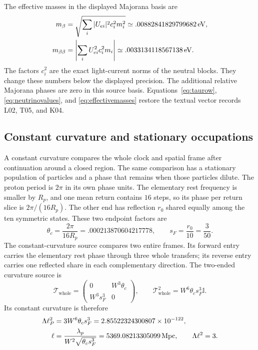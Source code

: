 \documentclass[aps,prx,onecolumn,10pt,notitlepage,nofootinbib,longbibliography]{revtex4-2}
\numberwithin{equation}{section}
\numberwithin{table}{section}
\newcommand{\Id}{\mathbb I}
\newcommand{\eV}{\,\mathrm{eV}}
\newcommand{\lamP}{\lambda_p}
\begin{document}
The effective masses in the displayed Majorana basis are
\begin{align}
 m_\beta&=\sqrt{\sum_i|U_{ei}|^2c_i^2m_i^2}\simeq.00882841829799682\eV,\notag\\
 m_{\beta\beta}&=\left|\sum_iU_{ei}^2c_i^2m_i\right|\simeq.0033134118567138\eV.
 \label{eq:effectivemasses}
\end{align}
The factors $c_i^2$ are the exact light-current norms of the neutral blocks. They change these numbers below the displayed precision. The additional relative Majorana phases are zero in this source basis. Equations~\eqref{eq:taurow}, \eqref{eq:neutrinovalues}, and \eqref{eq:effectivemasses} restore the textual vector records L02, T05, and K04.

\subsection{Constant curvature and stationary occupations}
A constant curvature compares the whole clock and spatial frame after continuation around a closed region. The same comparison has a stationary population of particles and a phase that remains when those particles dilute. The proton period is $2\pi$ in its own phase units. The elementary rest frequency is smaller by $R_p$, and one mean return contains $16$ steps, so its phase per return slice is $2\pi/(16R_p)$. The other end has reflection $r_0$ shared equally among the ten symmetric states. These two endpoint factors are
\begin{equation}
 \theta_c=\frac{2\pi}{16R_p}=.000213870604217778,\qquad
 s_F=\frac{r_0}{10}=\frac3{50}.
\end{equation}
The constant-curvature source compares two entire frames. Its forward entry carries the elementary rest phase through three whole transfers; its reverse entry carries one reflected share in each complementary direction. The two-ended curvature source is
\begin{equation}
 \mathcal T_{\mathrm{whole}}=
 \begin{pmatrix}0&W^3\theta_c\\W^3s_F^3&0\end{pmatrix},\qquad
 \mathcal T_{\mathrm{whole}}^2=W^6\theta_cs_F^3\Id.
 \label{eq:whole_source}
\end{equation}
Its constant curvature is therefore
\begin{align}
 \Lambda\ell_P^2&=3W^6\theta_cs_F^3
 =2.85522324300807\times10^{-122},\notag\\
 \ell&=\frac{\lamP}{W^2\sqrt{\theta_cs_F^3}}
 =5369.08213305099\,\mathrm{Mpc},\qquad \Lambda\ell^2=3.
 \label{eq:curvaturewhole}
\end{align}
\end{document}
